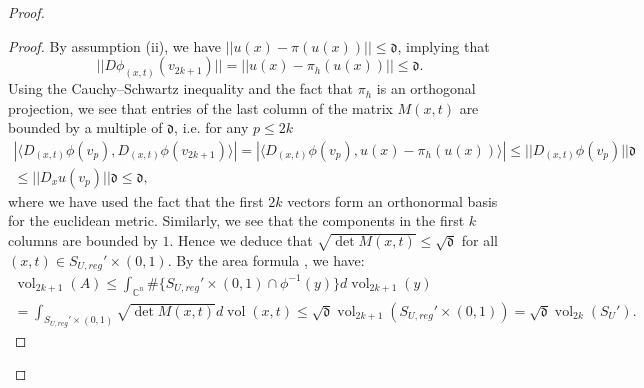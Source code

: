 \documentclass[12pt]{amsbook}%
\theoremstyle{definition}
\theoremstyle{remark}
\numberwithin{section}{chapter}
\numberwithin{subsection}{section}
\numberwithin{figure}{chapter}
\DeclareMathOperator{\C}{\mathbb{C}}
\DeclareMathOperator{\vol}{vol}
\def\fd{{\mathfrak{d}}}
\begin{document}
{{\begin{proof}
\begin{proof}
By assumption (ii), we have $||u(x) - \pi(u(x))|| \leqslant \fd$, implying that 
$$|| D\phi_{(x,t)} (v_{2k+1})|| = || u(x) - \pi_h (u (x))|| \leqslant \fd.$$  
Using the Cauchy--Schwartz inequality and the fact that $\pi_h$ is an orthogonal projection, we see that entries of the last column of the matrix $M(x,t)$ are bounded by a multiple of $\fd$, i.e. for any $p \leqslant 2k$ 
 \begin{multline*}
|\langle D_{(x,t)}\phi(v_p) , D_{(x,t)}\phi(v_{2k+1}) \rangle |  = | \langle D_{(x,t)} \phi(v_p) , u(x) - \pi_h (u(x)) \rangle| \leqslant ||D_{(x,t)} \phi(v_p)|| \fd  \\ \leqslant ||D_x u(v_p) || \fd \leqslant \fd,   
 \end{multline*}
 where we have used the fact that the first $2k$ vectors form an orthonormal basis for the euclidean metric. 
 Similarly, we see that the components in the first $k$ columns are bounded by $1$. Hence we deduce that $\sqrt{\det M(x,t) } \leqslant \sqrt{\fd} $ for all $(x,t) \in S_{U,reg}' \times (0,1)$. 
By the area formula \cite[Theorem 5.1.9]{krantz_parks}, we have: 
\begin{multline*}
\vol_{2k+1}(A)  \leqslant \int_{\C^n} \# \{ S_{U,reg}' \times (0,1) \cap \phi^{-1}(y)\} d\vol_{2k+1}(y)\\ =  \int_{S_{U,reg}' \times (0,1)} \sqrt{\det M(x,t)} d\vol(x,t)  
\leqslant  \sqrt{\fd} \vol_{2k+1}(S_{U,reg}' \times (0,1)) = \sqrt{\fd} \vol_{2k}(S_U').  
\end{multline*}



\end{proof}
\end{proof}}}
\end{document}
